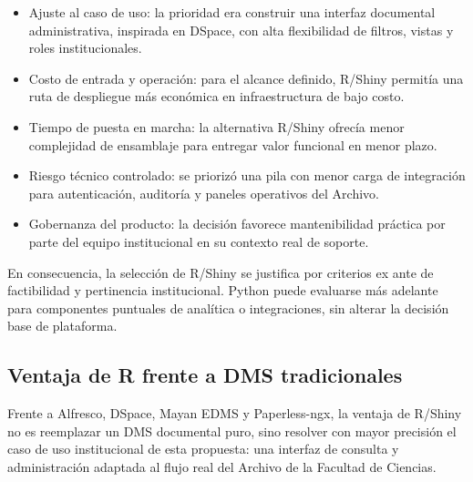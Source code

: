 \begin{itemize}
  \item Ajuste al caso de uso: la prioridad era construir una interfaz documental administrativa, inspirada en DSpace, con alta flexibilidad de filtros, vistas y roles institucionales.
  \item Costo de entrada y operación: para el alcance definido, R/Shiny permitía una ruta de despliegue más económica en infraestructura de bajo costo.
  \item Tiempo de puesta en marcha: la alternativa R/Shiny ofrecía menor complejidad de ensamblaje para entregar valor funcional en menor plazo.
  \item Riesgo técnico controlado: se priorizó una pila con menor carga de integración para autenticación, auditoría y paneles operativos del Archivo.
  \item Gobernanza del producto: la decisión favorece mantenibilidad práctica por parte del equipo institucional en su contexto real de soporte.
\end{itemize}

En consecuencia, la selección de R/Shiny se justifica por criterios ex ante de factibilidad y pertinencia institucional. Python puede evaluarse más adelante para componentes puntuales de analítica o integraciones, sin alterar la decisión base de plataforma.

\subsection{Ventaja de R frente a DMS tradicionales}
Frente a Alfresco, DSpace, Mayan EDMS y Paperless-ngx, la ventaja de R/Shiny no es reemplazar un DMS documental puro, sino resolver con mayor precisión el caso de uso institucional de esta propuesta: una interfaz de consulta y administración adaptada al flujo real del Archivo de la Facultad de Ciencias.

